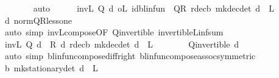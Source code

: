 \begin{isabellebody}
\ \ \ \ \ \ \isamarkupfalse%
\ auto\isanewline
\ \ \ \ \isamarkupfalse%
\ {\isachardoublequoteopen}{\isacharparenleft}{\kern0pt}inv\isactrlsub L\ {\isacharparenleft}{\kern0pt}Q\ d\ o\isactrlsub L\ {\isacharparenleft}{\kern0pt}id{\isacharunderscore}{\kern0pt}blinfun\ {\isacharminus}{\kern0pt}\ {\isacharquery}{\kern0pt}QR{\isacharparenright}{\kern0pt}{\isacharparenright}{\kern0pt}{\isacharparenright}{\kern0pt}\ {\isacharparenleft}{\kern0pt}r{\isacharunderscore}{\kern0pt}dec\isactrlsub b\ {\isacharparenleft}{\kern0pt}mk{\isacharunderscore}{\kern0pt}dec{\isacharunderscore}{\kern0pt}det\ d{\isacharparenright}{\kern0pt}{\isacharparenright}{\kern0pt}\ {\isasymle}\ L{\isachardoublequoteclose}\isanewline
\ \ \ \ \ \ \isamarkupfalse%
\ d\ norm{\isacharunderscore}{\kern0pt}QR{\isacharunderscore}{\kern0pt}less{\isacharunderscore}{\kern0pt}one\isanewline
\ \ \ \ \ \ \isamarkupfalse%
\ {\isacharparenleft}{\kern0pt}auto\ simp{\isacharcolon}{\kern0pt}\ inv\isactrlsub L{\isacharunderscore}{\kern0pt}compose{\isacharbrackleft}{\kern0pt}OF\ Q{\isacharunderscore}{\kern0pt}invertible\ invertible\isactrlsub L{\isacharunderscore}{\kern0pt}inf{\isacharunderscore}{\kern0pt}sum{\isacharbrackright}{\kern0pt}{\isacharparenright}{\kern0pt}\isanewline
\ \ \ \ \isamarkupfalse%
\ {\isachardoublequoteopen}{\isacharparenleft}{\kern0pt}inv\isactrlsub L\ {\isacharparenleft}{\kern0pt}Q\ d\ {\isacharminus}{\kern0pt}\ R\ d{\isacharparenright}{\kern0pt}{\isacharparenright}{\kern0pt}\ {\isacharparenleft}{\kern0pt}r{\isacharunderscore}{\kern0pt}dec\isactrlsub b\ {\isacharparenleft}{\kern0pt}mk{\isacharunderscore}{\kern0pt}dec{\isacharunderscore}{\kern0pt}det\ d{\isacharparenright}{\kern0pt}{\isacharparenright}{\kern0pt}\ {\isasymle}\ L{\isachardoublequoteclose}\isanewline
\ \ \ \ \ \ \isamarkupfalse%
\ Q{\isacharunderscore}{\kern0pt}invertible\ d\isanewline
\ \ \ \ \ \ \isamarkupfalse%
\ {\isacharparenleft}{\kern0pt}auto\ simp{\isacharcolon}{\kern0pt}\ blinfun{\isacharunderscore}{\kern0pt}compose{\isacharunderscore}{\kern0pt}diff{\isacharunderscore}{\kern0pt}right\ blinfun{\isacharunderscore}{\kern0pt}compose{\isacharunderscore}{\kern0pt}assoc{\isacharbrackleft}{\kern0pt}symmetric{\isacharbrackright}{\kern0pt}{\isacharparenright}{\kern0pt}\isanewline
\ \ \ \ \isamarkupfalse%
\ {\isachardoublequoteopen}{\isasymnu}\isactrlsub b\ {\isacharparenleft}{\kern0pt}mk{\isacharunderscore}{\kern0pt}stationary{\isacharunderscore}{\kern0pt}det\ d{\isacharparenright}{\kern0pt}\ {\isasymle}\ L{\isachardoublequoteclose}\isanewline

\end{isabellebody}
